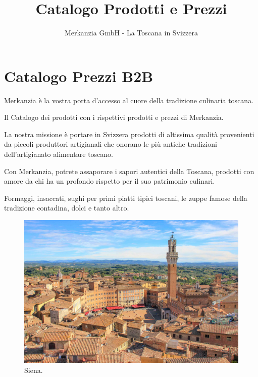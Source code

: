 \documentclass[
  beamerpaper,
  DIV=11,
  numbers=noendperiod,
  aspectratio=54]{scrreprt}
\title{Catalogo Prodotti e Prezzi}
\subtitle{Merkanzia GmbH - La Toscana in Svizzera}
\author{}
\date{November 30, 2023\\
\strut \\
\strut \\
info@merkanzia.com}
\begin{document}
\maketitle
\ifdefined\Shaded\renewenvironment{Shaded}{\begin{tcolorbox}[interior hidden, borderline west={3pt}{0pt}{shadecolor}, enhanced, sharp corners, breakable, frame hidden, boxrule=0pt]}{\end{tcolorbox}}\fi

\renewcommand{\arraystretch}{1.6}

\hypertarget{catalogo-prezzi-b2b}{%
\chapter{Catalogo Prezzi B2B}\label{catalogo-prezzi-b2b}}

Merkanzia è la vostra porta d'accesso al cuore della tradizione
culinaria toscana.

Il Catalogo dei prodotti con i rispettivi prodotti e prezzi di
Merkanzia.

La nostra missione è portare in Svizzera prodotti di altissima qualità
provenienti da piccoli produttori artigianali che onorano le più antiche
tradizioni dell'artigianato alimentare toscano.

Con Merkanzia, potrete assaporare i sapori autentici della Toscana,
prodotti con amore da chi ha un profondo rispetto per il suo patrimonio
culinari.

Formaggi, insaccati, sughi per primi piatti tipici toscani, le zuppe
famose della tradizione contadina, dolci e tanto altro.

\begin{figure}

{\centering \includegraphics{../img/Siena-n-1-scaled.jpg}

}

\caption{Siena.}

\end{figure}
\end{document}
